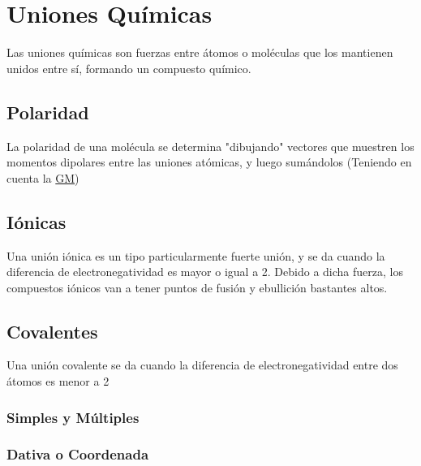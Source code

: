 \documentclass[../teoria.root.tex]{subfiles}
\begin{document}
\section{Uniones Químicas}
Las uniones químicas son fuerzas entre átomos o moléculas que los mantienen unidos entre sí, formando un compuesto químico.

\subsection{Polaridad}
La polaridad de una molécula se determina "dibujando" vectores que muestren los momentos dipolares entre las uniones atómicas, y luego sumándolos (Teniendo en cuenta la \hyperref[sec:trepev]{GM})

\subsection{Iónicas}
Una unión iónica es un tipo particularmente fuerte unión, y se da cuando la diferencia de electronegatividad es mayor o igual a 2. Debido a dicha fuerza, los compuestos iónicos van a tener puntos de fusión y ebullición bastantes altos.

\subsection{Covalentes}
Una unión covalente se da cuando la diferencia de electronegatividad entre dos átomos es menor a 2

\subsubsection{Simples y Múltiples}

\subsubsection{Dativa o Coordenada}
\end{document}

